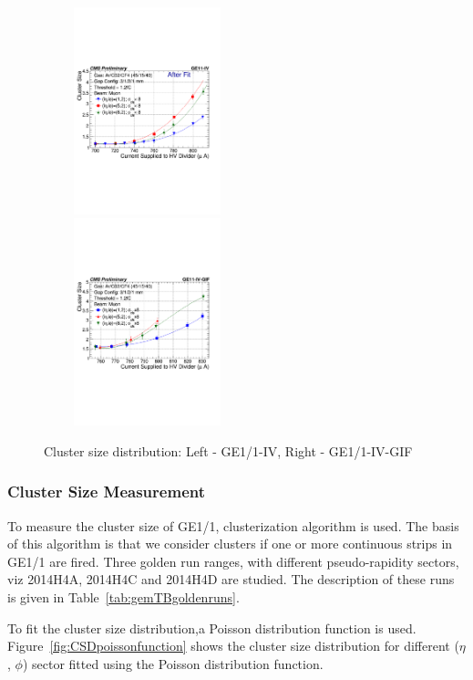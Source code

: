 \begin{figure}[!htbp]
   \begin{center}
     \includegraphics[width=6cm,height=6cm]{figures/GEM/CurrentvsClusterSizeAll3EtaPhi.pdf}%
     \includegraphics[width=6cm,height=6cm]{figures/GEM/CurrentvsClusterSizeAll3EtaPhiGE11IVGIF.pdf}
   \end{center}
   \caption{Cluster size distribution: Left - GE1/1-IV, Right - GE1/1-IV-GIF}
   \label{fig:CSDGE1/1}
\end{figure}


\subsubsection{Cluster Size Measurement}
To measure the cluster size of GE1/1, clusterization algorithm is used.
The basis of this algorithm is that we consider clusters if one or more continuous strips in GE1/1 are fired.
Three golden run ranges, with different pseudo-rapidity sectors, viz 2014H4A, 2014H4C and 2014H4D are studied.
The description of these runs is given in Table~\ref{tab:gemTBgoldenruns}.

To fit the cluster size distribution,a Poisson distribution function is used. Figure~\ref{fig:CSDpoissonfunction} shows the cluster size distribution for different ($\eta$, $\phi$) sector fitted using the Poisson distribution function.

